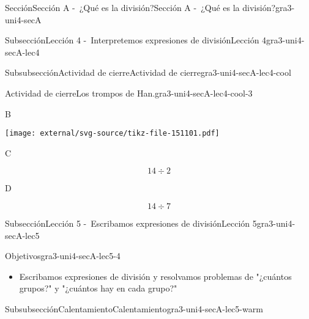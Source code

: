 \documentclass[twoside,10pt,]{article}
\begin{document}
\begin{sectionptx}{Sección}{Sección A -~¿Qué es la división?}{}{Sección A -~¿Qué es la división?}{}{}{gra3-uni4-secA}
\begin{subsectionptx}{Subsección}{Lección 4 -~Interpretemos expresiones de división}{}{Lección 4}{}{}{gra3-uni4-secA-lec4}
\begin{subsubsectionptx}{Subsubsección}{Actividad de cierre}{}{Actividad de cierre}{}{}{gra3-uni4-secA-lec4-cool}
\begin{project}{Actividad de cierre}{Los trompos de Han.}{gra3-uni4-secA-lec4-cool-3}
\begin{sidebyside}{4}{0.0075}{0.0075}{0.015}
\begin{sbspanel}{0.02}%
B%
\end{sbspanel}%
\begin{sbspanel}{0.45}%
\texttt{[image: external/svg-source/tikz-file-151101.pdf]}
\end{sbspanel}%
\end{sidebyside}%
\begin{sidebyside}{4}{0.0075}{0.0075}{0.015}%
\begin{sbspanel}{0.02}%
C%
\end{sbspanel}%
\begin{sbspanel}{0.45}%
\par
%
\begin{equation*}
14\div 2
\end{equation*}
%
\end{sbspanel}%
\begin{sbspanel}{0.02}%
\par
D%
\end{sbspanel}%
\begin{sbspanel}{0.45}%
\par
%
\begin{equation*}
14\div 7
\end{equation*}
%
\end{sbspanel}%
\end{sidebyside}%
\end{project}%
\end{subsubsectionptx}
\end{subsectionptx}
%
%
\typeout{************************************************}
\typeout{************************************************}
%
\begin{subsectionptx}{Subsección}{Lección 5 -~Escribamos expresiones de división}{}{Lección 5}{}{}{gra3-uni4-secA-lec5}
\begin{objectives}{Objetivos}{gra3-uni4-secA-lec5-4}
%
\begin{itemize}[label=\textbullet]
\item{}Escribamos expresiones de división y resolvamos problemas de "¿cuántos grupos?" y "¿cuántos hay en cada grupo?"%
\end{itemize}
\end{objectives}
%
%
\typeout{************************************************}
\typeout{************************************************}
%
\begin{subsubsectionptx}{Subsubsección}{Calentamiento}{}{Calentamiento}{}{}{gra3-uni4-secA-lec5-warm}

\end{subsubsectionptx}
\end{subsectionptx}
\end{sectionptx}
\end{document}
